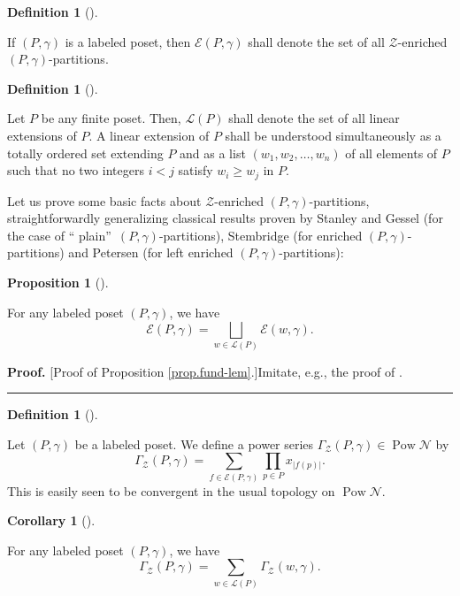 \documentclass[numbers=enddot,12pt,final,onecolumn,notitlepage]{scrartcl}%
\theoremstyle{definition}
\newtheorem{prop}[theo]{Proposition}
\newenvironment{proposition}[1][]
{\begin{prop}[#1]\begin{leftbar}}
{\end{leftbar}\end{prop}}
\newtheorem{defi}[theo]{Definition}
\newenvironment{definition}[1][]
{\begin{defi}[#1]\begin{leftbar}}
{\end{leftbar}\end{defi}}
\newtheorem{coro}[theo]{Corollary}
\newenvironment{corollary}[1][]
{\begin{coro}[#1]\begin{leftbar}}
{\end{leftbar}\end{coro}}
\newenvironment{proof}[1][Proof]{\noindent\textbf{#1.} }{\ \rule{0.5em}{0.5em}}
\let\sumnonlimits\sum
\let\prodnonlimits\prod
\renewcommand{\sum}{\sumnonlimits\limits}
\renewcommand{\prod}{\prodnonlimits\limits}
\begin{document}
\begin{definition}
If $\left(  P,\gamma\right)  $ is a labeled poset, then $\mathcal{E}\left(
P,\gamma\right)  $ shall denote the set of all $\mathcal{Z}$-enriched $\left(
P,\gamma\right)  $-partitions.
\end{definition}

\begin{definition}
Let $P$ be any finite poset. Then, $\mathcal{L}\left(  P\right)  $ shall
denote the set of all linear extensions of $P$. A linear extension of $P$
shall be understood simultaneously as a totally ordered set extending $P$ and
as a list $\left(  w_{1},w_{2},\ldots,w_{n}\right)  $ of all elements of $P$
such that no two integers $i<j$ satisfy $w_{i}\geq w_{j}$ in $P$.
\end{definition}

Let us prove some basic facts about $\mathcal{Z}$-enriched $\left(
P,\gamma\right)  $-partitions, straightforwardly generalizing classical
results proven by Stanley and Gessel (for the case of \textquotedblleft
plain\textquotedblright\ $\left(  P,\gamma\right)  $-partitions), Stembridge
(for enriched $\left(  P,\gamma\right)  $-partitions) and Petersen (for left
enriched $\left(  P,\gamma\right)  $-partitions):

\begin{proposition}
\label{prop.fund-lem}For any labeled poset $\left(  P,\gamma\right)  $, we
have%
\[
\mathcal{E}\left(  P,\gamma\right)  =\bigsqcup_{w\in\mathcal{L}\left(
P\right)  }\mathcal{E}\left(  w,\gamma\right)  .
\]

\end{proposition}

\begin{proof}
[Proof of Proposition \ref{prop.fund-lem}.]Imitate, e.g., the proof of
\cite[Lemma 2.1]{Stembr97}.
\end{proof}

\begin{definition}
\label{def.GammaZ}Let $\left(  P,\gamma\right)  $ be a labeled poset. We
define a power series $\Gamma_{\mathcal{Z}}\left(  P,\gamma\right)
\in\operatorname*{Pow}\mathcal{N}$ by%
\[
\Gamma_{\mathcal{Z}}\left(  P,\gamma\right)  =\sum_{f\in\mathcal{E}\left(
P,\gamma\right)  }\prod_{p\in P}x_{\left\vert f\left(  p\right)  \right\vert
}.
\]
This is easily seen to be convergent in the usual topology on
$\operatorname*{Pow}\mathcal{N}$.
\end{definition}

\begin{corollary}
\label{cor.fund-lem}For any labeled poset $\left(  P,\gamma\right)  $, we have%
\[
\Gamma_{\mathcal{Z}}\left(  P,\gamma\right)  =\sum_{w\in\mathcal{L}\left(
P\right)  }\Gamma_{\mathcal{Z}}\left(  w,\gamma\right)  .
\]

\end{corollary}
\end{document}
